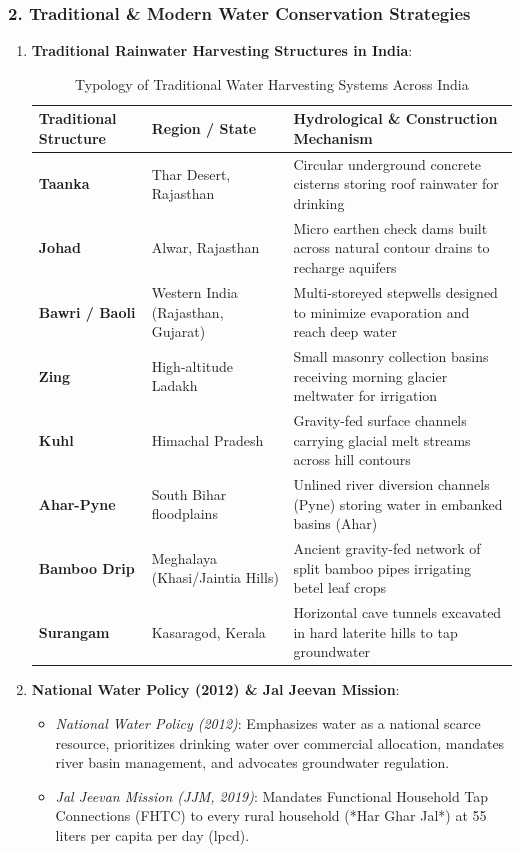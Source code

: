 \documentclass[11pt,a4paper]{article}
\begin{document}
\subsubsection{2. Traditional \& Modern Water Conservation Strategies}
\begin{enumerate}[leftmargin=*]
  \item \textbf{Traditional Rainwater Harvesting Structures in India}:
  \begin{table}[h!]
  \centering
  \small
  \begin{tabularx}{\textwidth}{l X X}
  \toprule
  \textbf{Traditional Structure} & \textbf{Region / State} & \textbf{Hydrological \& Construction Mechanism} \\
  \midrule
  \textbf{Taanka} & Thar Desert, Rajasthan & Circular underground concrete cisterns storing roof rainwater for drinking \\
  \textbf{Johad} & Alwar, Rajasthan & Micro earthen check dams built across natural contour drains to recharge aquifers \\
  \textbf{Bawri / Baoli} & Western India (Rajasthan, Gujarat) & Multi-storeyed stepwells designed to minimize evaporation and reach deep water \\
  \textbf{Zing} & High-altitude Ladakh & Small masonry collection basins receiving morning glacier meltwater for irrigation \\
  \textbf{Kuhl} & Himachal Pradesh & Gravity-fed surface channels carrying glacial melt streams across hill contours \\
  \textbf{Ahar-Pyne} & South Bihar floodplains & Unlined river diversion channels (Pyne) storing water in embanked basins (Ahar) \\
  \textbf{Bamboo Drip} & Meghalaya (Khasi/Jaintia Hills) & Ancient gravity-fed network of split bamboo pipes irrigating betel leaf crops \\
  \textbf{Surangam} & Kasaragod, Kerala & Horizontal cave tunnels excavated in hard laterite hills to tap groundwater \\
  \bottomrule
  \end{tabularx}
  \caption{Typology of Traditional Water Harvesting Systems Across India}
  \end{table}

  \item \textbf{National Water Policy (2012) \& Jal Jeevan Mission}:
  \begin{itemize}
    \item \textit{National Water Policy (2012)}: Emphasizes water as a national scarce resource, prioritizes drinking water over commercial allocation, mandates river basin management, and advocates groundwater regulation.
    \item \textit{Jal Jeevan Mission (JJM, 2019)}: Mandates Functional Household Tap Connections (FHTC) to every rural household (*Har Ghar Jal*) at 55 liters per capita per day (lpcd).
  \end{itemize}


\end{enumerate}
\end{document}
